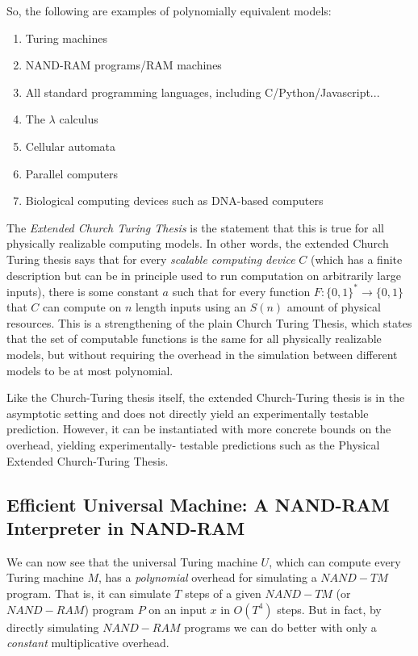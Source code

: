 \documentclass{article}
\begin{document}
  So, the following are examples of polynomially equivalent models: 
  \begin{enumerate}
      \item Turing machines
      \item NAND-RAM programs/RAM machines
      \item All standard programming languages, including C/Python/Javascript...
      \item The $\lambda$ calculus
      \item Cellular automata
      \item Parallel computers
      \item Biological computing devices such as DNA-based computers 
  \end{enumerate}

  The \textit{Extended Church Turing Thesis} is the statement that this is true for all physically realizable computing models. In other words, the extended Church Turing thesis says that for every \textit{scalable computing device} $C$ (which has a finite description but can be in principle used to run computation on arbitrarily large inputs), there is some constant $a$ such that for every function $F: \{0,1\}^* \longrightarrow \{0,1\}$ that $C$ can compute on $n$ length inputs using an $S(n)$ amount of physical resources. This is a strengthening of the plain Church Turing Thesis, which states that the set of computable functions is the same for all physically realizable models, but without requiring the overhead in the simulation between different models to be at most polynomial. 

  Like the Church-Turing thesis itself, the extended Church-Turing thesis is in the asymptotic setting and does not directly yield an experimentally testable prediction. However, it can be instantiated with more concrete bounds on the overhead, yielding experimentally- testable predictions such as the Physical Extended Church-Turing Thesis. 
   
  \subsection{Efficient Universal Machine: A NAND-RAM Interpreter in NAND-RAM}
  We can now see that the universal Turing machine $U$, which can compute every Turing machine $M$, has a \textit{polynomial} overhead for simulating a $NAND-TM$ program. That is, it can simulate $T$ steps of a given $NAND-TM$ (or $NAND-RAM$) program $P$ on an input $x$ in $O(T^4)$ steps. But in fact, by directly simulating $NAND-RAM$ programs we can do better with only a \textit{constant} multiplicative overhead. 
\end{document}
